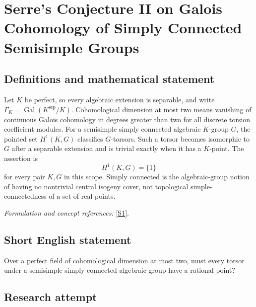 \documentclass[11pt,a4paper]{article}
\newcommand{\sref}[2]{\hyperlink{source:#1:#2}{[S#2]}}
\newif\ifshowcatalogue
\newcommand{\cataloguescope}[1]{\ifshowcatalogue
 \paragraph{Exact scope in the supplied catalogue.}
 \begin{quote}\small #1\end{quote}\fi}
\numberwithin{equation}{section}
\begin{document}
\setcounter{section}{0}
\clearpage
\section*{\texorpdfstring{Serre's Conjecture II on Galois Cohomology of Simply Connected Semisimple Groups}{Serre's Conjecture II on Galois Cohomology of Simply Connected Semisimple Groups}}\label{statement}
\subsection{Definitions and mathematical statement}
Let $K$ be perfect, so every algebraic extension is separable, and write $\Gamma_K=\operatorname{Gal}(K^{\mathrm{sep}}/K)$. Cohomological dimension at most two means vanishing of continuous Galois cohomology in degrees greater than two for all discrete torsion coefficient modules. For a semisimple simply connected algebraic $K$-group $G$, the pointed set $H^1(K,G)$ classifies $G$-torsors. Such a torsor becomes isomorphic to $G$ after a separable extension and is trivial exactly when it has a $K$-point. The assertion is
\[
 H^1(K,G)=\{1\}
\]
for every pair $K,G$ in this scope. Simply connected is the algebraic-group notion of having no nontrivial central isogeny cover, not topological simple-connectedness of a set of real points.
\par\smallskip\textit{Formulation and concept references:} \sref{statement}{1}.
\cataloguescope{Let K be a perfect field of cohomological dimension at most 2. Prove that every principal homogeneous space under a semisimple simply connected linear algebraic K-group has a rational point, i.e. H\textasciicircum{}1(K,G) = 1 for every such group G.}
\subsection{Short English statement}
Over a perfect field of cohomological dimension at most two, must every torsor under a semisimple simply connected algebraic group have a rational point?
\subsection{Research attempt}
\end{document}
